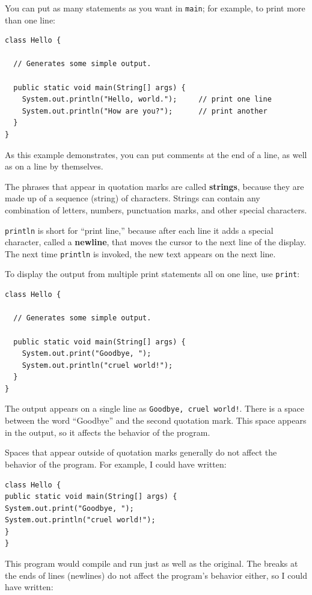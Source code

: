 \documentclass[12pt]{book}
\theoremstyle{exercise}
\begin{document}
You can put as many
statements as you want in {\tt main}; for example, to
print more than one line:

\begin{lstlisting}
class Hello {

  // Generates some simple output.

  public static void main(String[] args) {
    System.out.println("Hello, world.");     // print one line
    System.out.println("How are you?");      // print another
  }
}
\end{lstlisting}
%
As this example demonstrates, you can put comments at the
end of a line, as well as on a line by themselves.


The phrases that appear in quotation marks are called {\bf strings},
because they are made up of a sequence (string) of characters.
Strings can contain any combination of letters, numbers, punctuation
marks, and other special characters.


{\tt println} is short for ``print line,'' because after each
line it adds a special character, called a {\bf newline}, that
moves the cursor to the next line of the display.
The next time {\tt println} is invoked, the new text appears
on the next line.

To display the output from multiple print
statements all on one line, use {\tt print}:

\begin{lstlisting}
class Hello {

  // Generates some simple output.

  public static void main(String[] args) {
    System.out.print("Goodbye, ");
    System.out.println("cruel world!");
  }
}
\end{lstlisting}
%
The output appears on a single line as
{\tt Goodbye, cruel world!}.  There is a space
between the word ``Goodbye'' and the second quotation mark.
This space appears in the output, so it affects the behavior
of the program.

Spaces that appear outside of quotation marks generally do
not affect the behavior of the program.  For example, I
could have written:

\begin{lstlisting}
class Hello {
public static void main(String[] args) {
System.out.print("Goodbye, ");
System.out.println("cruel world!");
}
}
\end{lstlisting}
%
This program would compile and run just as well as the original.
The breaks at the ends of lines (newlines) do not affect
the program's behavior either, so I could have written:
\end{document}
